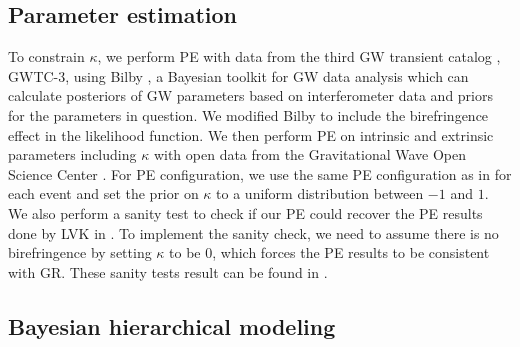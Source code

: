 \documentclass[aps,prd,twocolumn,superscriptaddress,preprintnumbers,floatfix,nofootinbib]{revtex4-2}
\begin{document}
\subsection{Parameter estimation}
To constrain $\kappa$, we perform PE with data from the third GW transient catalog \citep{GWTC-2.1, GWTC-3}, GWTC-3, using Bilby \citep{Bilby}, a Bayesian toolkit for GW data analysis which can calculate posteriors of GW parameters based on interferometer data and priors for the parameters in question.
We modified Bilby to include the birefringence effect in the likelihood function.
We then perform PE on intrinsic and extrinsic parameters including $\kappa$ with open data from the Gravitational Wave Open Science Center \citep{GWOSC}.
For PE configuration, we use the same PE configuration as in \citet{GWTC-2.1, GWTC-3} for each event and set the prior on $\kappa$ to a uniform distribution between $-1$ and $1$.
We also perform a sanity test to check if our PE could recover the PE results done by LVK in \citet{GWTC-2.1, GWTC-3}.
To implement the sanity check, we need to assume there is no birefringence by setting $\kappa$ to be $0$, which forces the PE results to be consistent with GR.
These sanity tests result can be found in \citet{dataset}.

\subsection{Bayesian hierarchical modeling}


\end{document}

